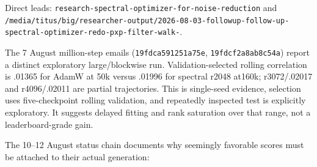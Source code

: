 \documentclass[
  british,
  10pt,
  a4paper,
]{article}
\begin{document}
Direct leads:
\texttt{research-\allowbreak{}spectral-\allowbreak{}optimizer-\allowbreak{}for-\allowbreak{}noise-\allowbreak{}reduction}
and
\texttt{/\allowbreak{}media/\allowbreak{}titus/\allowbreak{}big/\allowbreak{}researcher-\allowbreak{}output/\allowbreak{}2026-\allowbreak{}08-\allowbreak{}03-\allowbreak{}followup-\allowbreak{}follow-\allowbreak{}up-\allowbreak{}spectral-\allowbreak{}optimizer-\allowbreak{}redo-\allowbreak{}pxp-\allowbreak{}filter-\allowbreak{}walk-\allowbreak{}}.

The 7 August million-\allowbreak{}step emails
(\texttt{19fdca591251\allowbreak{}a75e},
\texttt{19fdcf2a8ab8\allowbreak{}c54a}) report a distinct exploratory
large/\allowbreak{}blockwise run. Validation-\allowbreak{}selected
rolling correlation is .01365 for AdamW at 50k versus .01996 for
spectral r2048 at160k; r3072/\allowbreak{}.\allowbreak{}02017 and
r4096/\allowbreak{}.\allowbreak{}02011 are partial
trajectories\allowbreak{}.\allowbreak{} This is single-\allowbreak{}seed
evidence, selection uses five-\allowbreak{}checkpoint rolling
validation,\allowbreak{} and repeatedly inspected test is explicitly
exploratory.\allowbreak{} It suggests delayed fitting and rank
saturation over that range, not a leaderboard-\allowbreak{}grade gain.

The 10--12 August status chain documents why seemingly favorable scores
must be attached to their actual generation:
\end{document}
